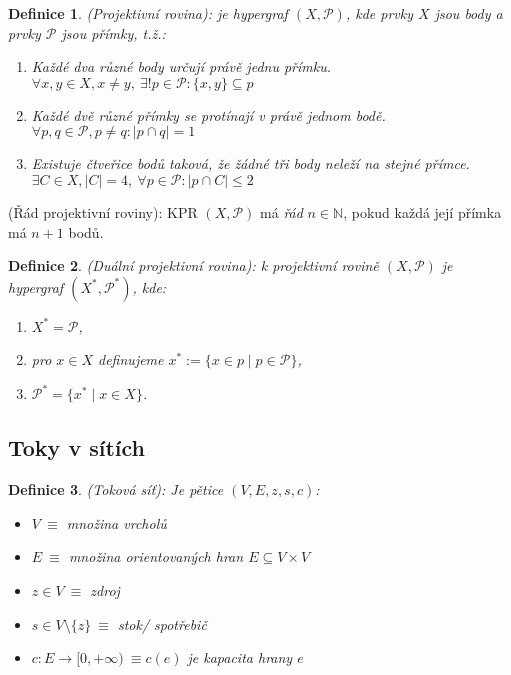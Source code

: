 \documentclass[10pt,a4paper]{article}
\newtheorem{definice}{Definice}
\newcommand{\N}{{\mathbb{N}}}       %
\newcommand{\Pp}{{\mathcal{P}}}     %
\begin{document}
\begin{definice} (Projektivní rovina): \normalfont je hypergraf $(X, \Pp)$, kde prvky $X$ jsou \textit{body} a prvky $\Pp$ jsou \textit{přímky}, t.ž.:
    \begin{enumerate}[label=(\roman*)]
        \item \textit{Každé dva různé body určují právě jednu přímku.}\\$\forall x,y \in X, x\neq y,~ \exists ! p\in \Pp : \{x,y\}\subseteq p$
        \item \textit{Každé dvě různé přímky se protínají v právě jednom bodě.}\\$\forall p,q \in \Pp, p\neq q: |p \cap q| = 1$
        \item \textit{Existuje čtveřice bodů taková, že žádné tři body neleží na stejné přímce.}\\$\exists C \in X, |C| = 4, ~ \forall p \in \Pp: |p \cap C| \leq 2$
    \end{enumerate}
\end{definice}
 (Řád projektivní roviny): \normalfont KPR $(X, \Pp)$ má \textit{řád} $n \in \N$, pokud každá její přímka má $n+1$ bodů.
\begin{definice} (Duální projektivní rovina): \normalfont
    k projektivní rovině $(X, \Pp)$ je hypergraf $(X^*, \Pp^*)$, kde:
    \begin{enumerate}[label=(\roman*)]
        \item $X^* = \Pp$,
        \item pro $x \in X$ definujeme $x^*:= \{x\in p \mid p\in \Pp\}$,
        \item $\Pp^* = \{x^* \mid x\in X\}$.
    \end{enumerate}
\end{definice}

\subsection{Toky v sítích}
\begin{definice} (Toková síť): \normalfont
    Je pětice $(V,E,z,s,c)$: \begin{itemize}
        \item $V~ \equiv$ množina vrcholů 
        \item $E~\equiv$ množina orientovaných hran $E \subseteq V \times V$
        \item $z\in V~ \equiv$ zdroj
        \item $s \in V\setminus\{z\}~\equiv$ stok/ spotřebič
        \item $c: E \to [0, +\infty) ~\equiv c(e)$ je kapacita hrany $e$
    \end{itemize}
\end{definice}
\end{document}
